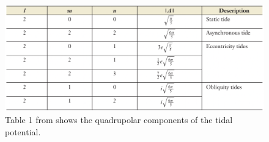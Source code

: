 \documentclass[oneside,12pt]{amsart}
\numberwithin{page}{section}
\begin{document}

\begin{figure}[htbp]
    \centering
    \includegraphics[width=\linewidth]{figs/ogilvie_tbl1.png}
    \caption{Table 1 from \citep{ogilvie2014tidal} shows the quadrupolar components of the tidal potential. }
    \label{fig:ogilvie-tbl1}
\end{figure}
\end{document}
